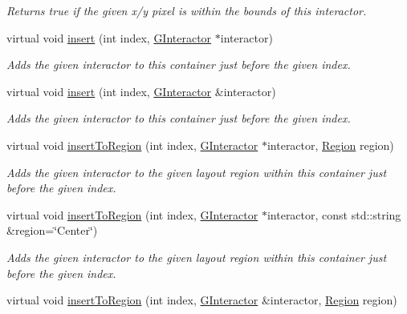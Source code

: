 \begin{DoxyCompactItemize}
\begin{DoxyCompactList}\small\item\em Returns true if the given x/y pixel is within the bounds of this interactor. \end{DoxyCompactList}\item 
virtual void \mbox{\hyperlink{classsgl_1_1GContainer_afffb8f789ff9a8466fbae5b846a0ebe7}{insert}} (int index, \mbox{\hyperlink{classsgl_1_1GInteractor}{G\+Interactor}} $\ast$interactor)
\begin{DoxyCompactList}\small\item\em Adds the given interactor to this container just before the given index. \end{DoxyCompactList}\item 
virtual void \mbox{\hyperlink{classsgl_1_1GContainer_a2e9d7c6d9e6769d4cfd3293afe7e215c}{insert}} (int index, \mbox{\hyperlink{classsgl_1_1GInteractor}{G\+Interactor}} \&interactor)
\begin{DoxyCompactList}\small\item\em Adds the given interactor to this container just before the given index. \end{DoxyCompactList}\item 
virtual void \mbox{\hyperlink{classsgl_1_1GContainer_a1c4b766b059991ad7d084ea03f22f1c5}{insert\+To\+Region}} (int index, \mbox{\hyperlink{classsgl_1_1GInteractor}{G\+Interactor}} $\ast$interactor, \mbox{\hyperlink{classsgl_1_1GContainer_a81a01a86de31071a92e6cce0bab9bc4b}{Region}} region)
\begin{DoxyCompactList}\small\item\em Adds the given interactor to the given layout region within this container just before the given index. \end{DoxyCompactList}\item 
virtual void \mbox{\hyperlink{classsgl_1_1GContainer_adeeb03feb9346a9cf2046427484c20bc}{insert\+To\+Region}} (int index, \mbox{\hyperlink{classsgl_1_1GInteractor}{G\+Interactor}} $\ast$interactor, const std\+::string \&region=\char`\"{}Center\char`\"{})
\begin{DoxyCompactList}\small\item\em Adds the given interactor to the given layout region within this container just before the given index. \end{DoxyCompactList}\item 
virtual void \mbox{\hyperlink{classsgl_1_1GContainer_a1be2b263cd8d28e61e136a19d8e935cc}{insert\+To\+Region}} (int index, \mbox{\hyperlink{classsgl_1_1GInteractor}{G\+Interactor}} \&interactor, \mbox{\hyperlink{classsgl_1_1GContainer_a81a01a86de31071a92e6cce0bab9bc4b}{Region}} region)

\end{DoxyCompactItemize}
